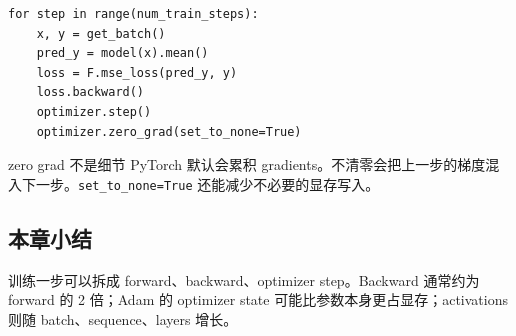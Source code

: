 \begin{lstlisting}[caption={最小训练循环}]
for step in range(num_train_steps):
    x, y = get_batch()
    pred_y = model(x).mean()
    loss = F.mse_loss(pred_y, y)
    loss.backward()
    optimizer.step()
    optimizer.zero_grad(set_to_none=True)
\end{lstlisting}

\begin{warningbox}{zero grad 不是细节}
PyTorch 默认会累积 gradients。不清零会把上一步的梯度混入下一步。\texttt{set\_to\_none=True} 还能减少不必要的显存写入。
\end{warningbox}

\subsection{本章小结}

训练一步可以拆成 forward、backward、optimizer step。Backward 通常约为 forward 的 2 倍；Adam 的 optimizer state 可能比参数本身更占显存；activations 则随 batch、sequence、layers 增长。

